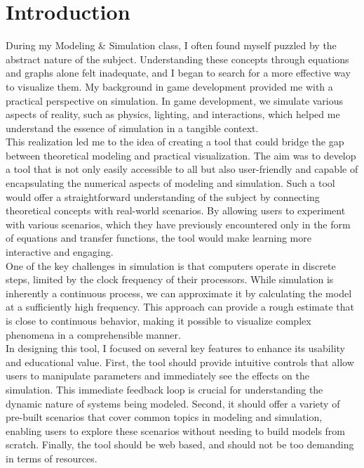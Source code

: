 \chapter{Introduction}

During my Modeling \& Simulation class, I often found myself puzzled by the abstract nature of the subject. Understanding these concepts through equations and graphs alone felt inadequate, and I began to search for a more effective way to visualize them. My background in game development provided me with a practical perspective on simulation. In game development, we simulate various aspects of reality, such as physics, lighting, and interactions, which helped me understand the essence of simulation in a tangible context.
\\

  This realization led me to the idea of creating a tool that could bridge the gap between theoretical modeling and practical visualization. The aim was to develop a tool that is not only easily accessible to all but also user-friendly and capable of encapsulating the numerical aspects of modeling and simulation. Such a tool would offer a straightforward understanding of the subject by connecting theoretical concepts with real-world scenarios. By allowing users to experiment with various scenarios, which they have previously encountered only in the form of equations and transfer functions, the tool would make learning more interactive and engaging.
\\

  One of the key challenges in simulation is that computers operate in discrete steps, limited by the clock frequency of their processors. While simulation is inherently a continuous process, we can approximate it by calculating the model at a sufficiently high frequency. This approach can provide a rough estimate that is close to continuous behavior, making it possible to visualize complex phenomena in a comprehensible manner.
\\

  In designing this tool, I focused on several key features to enhance its usability and educational value. First, the tool should provide intuitive controls that allow users to manipulate parameters and immediately see the effects on the simulation. This immediate feedback loop is crucial for understanding the dynamic nature of systems being modeled. Second, it should offer a variety of pre-built scenarios that cover common topics in modeling and simulation, enabling users to explore these scenarios without needing to build models from scratch. Finally, the tool should be web based, and should not be too demanding in terms of resources.
\\

